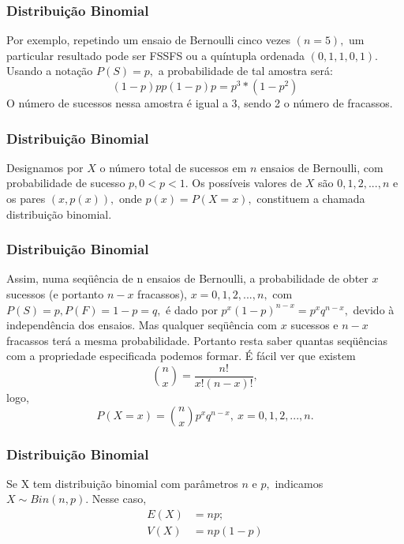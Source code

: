 \documentclass[14pt,aspectratio=1610]{beamer}
\begin{document}
\begin{frame}{}
\frametitle{Distribuição Binomial}
\begin{block}{}
\justifying
Por exemplo, repetindo um ensaio de Bernoulli cinco vezes $(n = 5),$ um particular resultado pode ser FSSFS ou a quíntupla ordenada $(0, 1, 1, 0, 1).$ Usando a notação 
$P(S) = p,$ a probabilidade de tal amostra será:
$$(1-p)pp(1-p)p=p^{3}*(1-p^{2})$$
O número de sucessos nessa amostra é igual a 3, sendo 2 o número de fracassos.
\end{block}
\end{frame}

\begin{frame}{}
\frametitle{Distribuição Binomial}
\begin{block}{}
\justifying
Designamos por $X$ o número total de sucessos em $n$ ensaios de Bernoulli, com
probabilidade de sucesso $p, 0 < p < 1.$ Os possíveis valores de $X$ são $0, 1, 2, ..., n$ e os pares $(x, p(x)),$ onde $p(x) = P(X = x),$ constituem a chamada distribuição binomial.
\end{block}
\end{frame}

\begin{frame}{}
\frametitle{Distribuição Binomial}
\begin{block}{}
\justifying
Assim, numa seqüência de n ensaios de Bernoulli, a probabilidade de obter $x$ sucessos (e portanto $n-x$ fracassos), $x = 0,1,2, ..., n,$ com $P(S) = p, P(F) = 1-p = q,$ é dado por $p^{x}(1-p)^{n-x}=p^{x}q^{n-x},$ devido à independência dos ensaios. Mas qualquer seqüência com $x$ sucessos e $n-x$ fracassos terá a mesma probabilidade. Portanto resta saber quantas seqüências com a propriedade especificada podemos formar. É fácil ver que existem $$\binom{n}{x}=\dfrac{n!}{x!(n-x)!},$$ logo, 
$$P(X=x)=\binom{n}{x}p^{x}q^{n-x},\ x = 0,1,2, ..., n.$$
\end{block}
\end{frame}

\begin{frame}{}
\frametitle{Distribuição Binomial}
\begin{block}{}
\justifying
Se X tem distribuição binomial com parâmetros $n$ e $p,$ indicamos $X\sim Bin(n,p).$ Nesse caso, 
\begin{align*}
E(X)&=np;\\
V(X)&=np(1-p)
\end{align*}
\end{block}
\end{frame}
\end{document}
